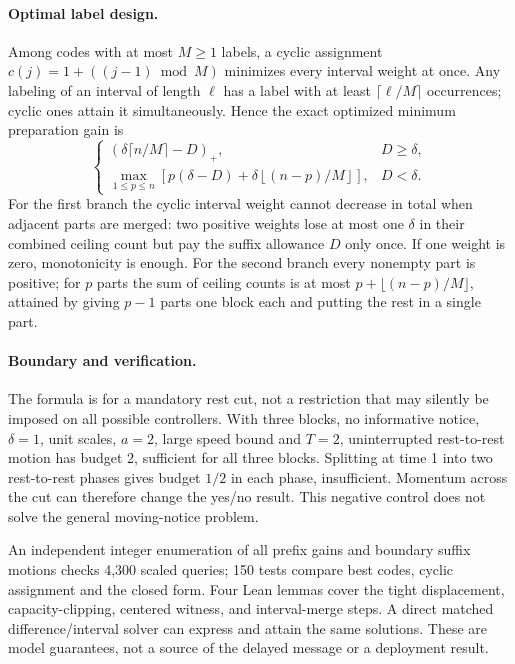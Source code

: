 \documentclass[11pt]{article}
\begin{document}
\paragraph{Optimal label design.}
Among codes with at most \(M\ge1\) labels, a cyclic assignment
\(c(j)=1+((j-1)\bmod M)\) minimizes every interval weight at once.
Any labeling of an interval of length \(\ell\) has a label
with at least \(\lceil\ell/M\rceil\) occurrences; cyclic ones
attain it simultaneously. Hence the exact optimized minimum
preparation gain is
\[
 \begin{cases}
  (\delta\lceil n/M\rceil-D)_+,&D\ge\delta,\\[2mm]
  \displaystyle\max_{1\le p\le n}
       \left[p(\delta-D)+\delta\left\lfloor(n-p)/M\right\rfloor\right],
       & D<\delta .
 \end{cases}
\]
For the first branch the cyclic interval weight cannot decrease
in total when adjacent parts are merged: two positive weights lose
at most one \(\delta\) in their combined ceiling count but pay
the suffix allowance \(D\) only once. If one weight is zero,
monotonicity is enough. For the second branch every nonempty part
is positive; for \(p\) parts the sum of ceiling counts is at most
\(p+\lfloor(n-p)/M\rfloor\), attained by giving \(p-1\) parts
one block each and putting the rest in a single part.

\paragraph{Boundary and verification.}
The formula is for a mandatory rest cut, not a restriction that
may silently be imposed on all possible controllers. With three
blocks, no informative notice, \(\delta=1\), unit scales,
\(a=2\), large speed bound and \(T=2\), uninterrupted
rest-to-rest motion has budget 2, sufficient for all three
blocks. Splitting at time 1 into two rest-to-rest phases gives
budget \(1/2\) in each phase, insufficient. Momentum across the
cut can therefore change the yes/no result. This negative control
does not solve the general moving-notice problem.

An independent integer enumeration of all prefix gains and
boundary suffix motions checks 4,300 scaled queries; 150 tests
compare best codes, cyclic assignment and the closed form.
Four Lean lemmas cover the tight displacement, capacity-clipping,
centered witness, and interval-merge steps. A direct matched
difference/interval solver can express and attain the same
solutions. These are model guarantees, not a source of the
delayed message or a deployment result.
\end{document}
